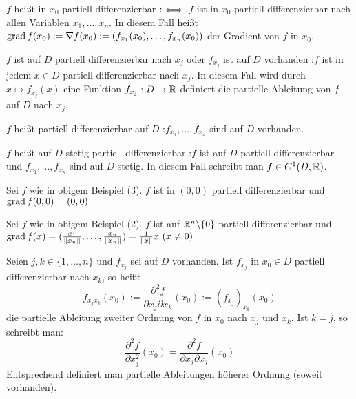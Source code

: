 \documentclass[a4paper,twoside,DIV15,BCOR12mm,chapterprefix=true,headings=twolinechapter]{scrbook}
\begin{document}
\def\grad{\mathop{\rm grad}\nolimits}
\begin{definition}
\begin{liste}
\item $f$ heißt in $x_0$ partiell differenzierbar $:\iff$ $f$ ist in $x_0$ partiell differenzierbar nach allen Variablen $x_1,\ldots, x_n$. In diesem Fall heißt $\grad f(x_0) := \nabla f(x_0) := (f_{x_1}(x_0),\ldots, f_{x_n}(x_0))$ der Gradient von $f$ in $x_0$. 
\item $f$ ist auf $D$ partiell differenzierbar nach $x_j$ oder $f_{x_j}$ ist auf $D$ vorhanden :\equizu $f$ ist in jedem $x\in D$ partiell differenzierbar nach $x_j$. In diesem Fall wird durch $x\mapsto f_{x_j}(x)$ eine Funktion $f_{x_j}: D\to \mathbb{R}$ definiert die partielle Ableitung von $f$ auf $D$ nach $x_j$.
\item $f$ heißt partiell differenzierbar auf $D$ :\equizu $f_{x_1},\ldots,f_{x_n}$ sind auf $D$ vorhanden.
\item $f$ heißt auf $D$ stetig partiell differenzierbar :\equizu $f$ ist auf $D$ partiell differenzierbar und $f_{x_1},\ldots,f_{x_n}$ sind auf $D$ stetig. In diesem Fall schreibt man $f\in C^1(D,\mathbb{R})$.
\end{liste}
\end{definition}

\begin{beispiele}
\item Sei $f$ wie in obigem Beispiel (3). $f$ ist in $(0,0)$ partiell differenzierbar und $\grad f(0,0) = (0,0)$
\item Sei $f$ wie in obigem Beispiel (2). $f$ ist auf $\mathbb{R}^n\backslash\{0\}$ partiell differenzierbar und $\grad f(x) = (\frac{x_1}{\|x_n\|},\ldots,\frac{x_n}{\|x_n\|}) = \frac{1}{\|x\|} x \ (x\ne 0)$
\end{beispiele}

\begin{definition}
Seien $j,k\in\{1,\ldots,n\}$ und $f_{x_j}$ sei auf $D$ vorhanden. Ist $f_{x_j}$ in $x_0\in D$ partiell differenzierbar nach $x_k$, so heißt $$f_{x_jx_k}(x_0) := \frac{\partial^2 f}{\partial x_j\partial x_k}(x_0) := \left(f_{x_j}\right)_{x_k}(x_0)$$ die partielle Ableitung zweiter Ordnung von $f$ in $x_0$ nach $x_j$ und $x_k$. Ist $k=j$, so schreibt man:
$$\frac{\partial^2 f}{\partial x_j^2}(x_0) = \frac{\partial^2 f}{\partial x_j\partial x_j}(x_0) $$ Entsprechend definiert man partielle Ableitungen höherer Ordnung (soweit vorhanden).
\end{definition}
\end{document}
